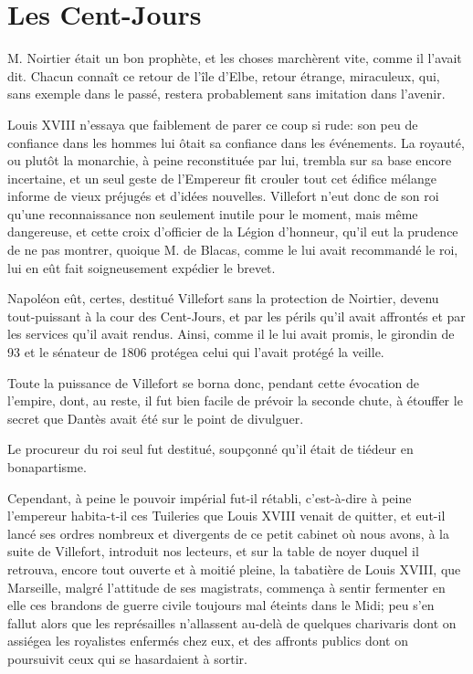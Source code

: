 \chapter{Les Cent-Jours}


\lettrine{M}{.} Noirtier était un bon prophète, et les choses marchèrent vite, comme il l'avait dit. Chacun connaît ce retour de l'île d'Elbe, retour étrange, miraculeux, qui, sans exemple dans le passé, restera probablement sans imitation dans l'avenir.

Louis XVIII n'essaya que faiblement de parer ce coup si rude: son peu de confiance dans les hommes lui ôtait sa confiance dans les événements. La royauté, ou plutôt la monarchie, à peine reconstituée par lui, trembla sur sa base encore incertaine, et un seul geste de l'Empereur fit crouler tout cet édifice mélange informe de vieux préjugés et d'idées nouvelles. Villefort n'eut donc de son roi qu'une reconnaissance non seulement inutile pour le moment, mais même dangereuse, et cette croix d'officier de la Légion d'honneur, qu'il eut la prudence de ne pas montrer, quoique M. de Blacas, comme le lui avait recommandé le roi, lui en eût fait soigneusement expédier le brevet.

Napoléon eût, certes, destitué Villefort sans la protection de Noirtier, devenu tout-puissant à la cour des Cent-Jours, et par les périls qu'il avait affrontés et par les services qu'il avait rendus. Ainsi, comme il le lui avait promis, le girondin de 93 et le sénateur de 1806 protégea celui qui l'avait protégé la veille.

Toute la puissance de Villefort se borna donc, pendant cette évocation de l'empire, dont, au reste, il fut bien facile de prévoir la seconde chute, à étouffer le secret que Dantès avait été sur le point de divulguer.

Le procureur du roi seul fut destitué, soupçonné qu'il était de tiédeur en bonapartisme.

Cependant, à peine le pouvoir impérial fut-il rétabli, c'est-à-dire à peine l'empereur habita-t-il ces Tuileries que Louis XVIII venait de quitter, et eut-il lancé ses ordres nombreux et divergents de ce petit cabinet où nous avons, à la suite de Villefort, introduit nos lecteurs, et sur la table de noyer duquel il retrouva, encore tout ouverte et à moitié pleine, la tabatière de Louis XVIII, que Marseille, malgré l'attitude de ses magistrats, commença à sentir fermenter en elle ces brandons de guerre civile toujours mal éteints dans le Midi; peu s'en fallut alors que les représailles n'allassent au-delà de quelques charivaris dont on assiégea les royalistes enfermés chez eux, et des affronts publics dont on poursuivit ceux qui se hasardaient à sortir.

